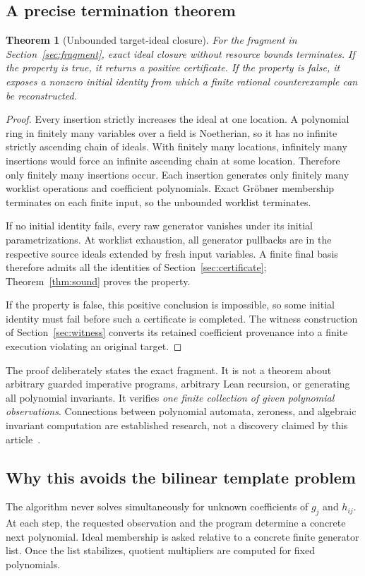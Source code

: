 \documentclass[11pt,letterpaper]{article}
\newtheorem{theorem}{Theorem}[section]
\theoremstyle{definition}
\begin{document}
\subsection{A precise termination theorem}
\begin{theorem}[Unbounded target-ideal closure]\label{thm:ideal}
For the fragment in Section~\ref{sec:fragment}, exact ideal closure without
resource bounds terminates. If the property is true, it returns a positive
certificate. If the property is false, it exposes a nonzero initial identity
from which a finite rational counterexample can be reconstructed.
\end{theorem}
\begin{proof}
Every insertion strictly increases the ideal at one location. A polynomial ring
in finitely many variables over a field is Noetherian, so it has no infinite
strictly ascending chain of ideals. With finitely many locations, infinitely
many insertions would force an infinite ascending chain at some location.
Therefore only finitely many insertions occur. Each insertion generates only
finitely many worklist operations and coefficient polynomials. Exact Gr\"obner
membership terminates on each finite input, so the unbounded worklist terminates.

If no initial identity fails, every raw generator vanishes under its initial
parametrizations. At worklist exhaustion, all generator pullbacks are in the
respective source ideals extended by fresh input variables. A finite final
basis therefore admits all the identities of Section~\ref{sec:certificate};
Theorem~\ref{thm:sound} proves the property.

If the property is false, this positive conclusion is impossible, so some
initial identity must fail before such a certificate is completed. The witness
construction of Section~\ref{sec:witness} converts its retained coefficient
provenance into a finite execution violating an original target.
\end{proof}

The proof deliberately states the exact fragment. It is not a theorem about
arbitrary guarded imperative programs, arbitrary Lean recursion, or generating
all polynomial invariants. It verifies \emph{one finite collection of given
polynomial observations}. Connections between polynomial automata, zeroness,
and algebraic invariant computation are established research, not a discovery
claimed by this article~\cite{polynomial-automata,polynomial-invariants}.

\subsection{Why this avoids the bilinear template problem}
The algorithm never solves simultaneously for unknown coefficients of $g_j$
and $h_{ij}$. At each step, the requested observation and the program determine
a concrete next polynomial. Ideal membership is asked relative to a concrete
finite generator list. Once the list stabilizes, quotient multipliers are
computed for fixed polynomials.
\end{document}

